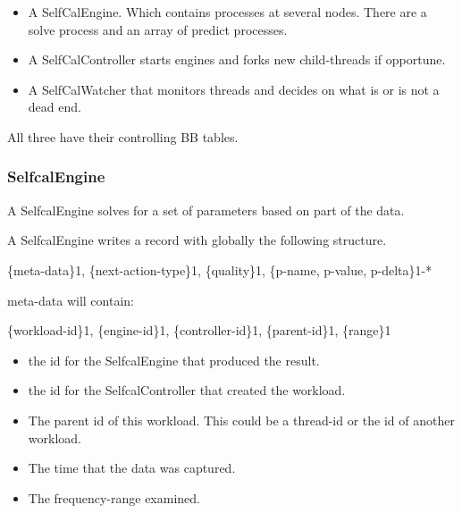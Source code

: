 \documentclass[]{lofar}
\begin{document}
      \begin{itemize}

	\item 

          A SelfCalEngine. Which contains processes at several
          nodes. There are a solve process and an array of predict
          processes.

	\item 

          A SelfCalController starts engines and forks new
          child-threads if opportune.

	\item 

          A SelfCalWatcher that monitors threads and decides on what
          is or is not a dead end.

      \end{itemize}

      All three have their controlling BB tables.

      \subsubsection{SelfcalEngine}
      \label{subsubsec:SelfcalEngine}\hypertarget{subsubsec:SelfcalEngine}{}

        A SelfcalEngine solves for a set of parameters based on part
        of the data.

        A SelfcalEngine writes a record with globally the following
        structure.

        \{meta-data\}1, \{next-action-type\}1, \{quality\}1, \{p-name, p-value, p-delta\}1-*

        meta-data will contain:

        \{workload-id\}1, \{engine-id\}1, \{controller-id\}1, \{parent-id\}1, \{range\}1

        \begin{itemize}

	  \item 

            the id for the SelfcalEngine that produced the result.

	  \item 

            the id for the SelfcalController that created the workload.

	  \item 

            The parent id of this workload. This could be a thread-id
            or the id of another workload.

	  \item 

            The time that the data was captured.

	  \item 

            The frequency-range examined.

        \end{itemize}
\end{document}
